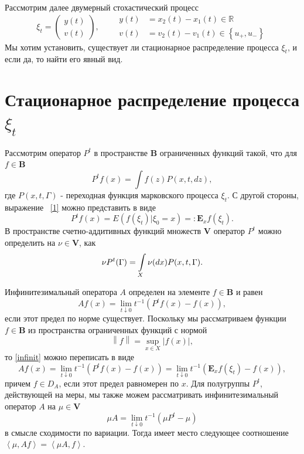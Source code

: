 \documentclass[12pt,a4paper]{article}
\begin{document}
Рассмотрим далее двумерный стохастический процесс 
\begin{equation*}
\xi_t = \begin{pmatrix}
 y(t) \\
 v(t)
\end{pmatrix}, \qquad 
\begin{aligned}
y(t) &= x_2(t) - x_1(t) \in \mathbb{R} \\
v(t) &= v_2(t) - v_1(t) \in \left\{ u_+, u_- \right\} 
\end{aligned}
\end{equation*}
Мы хотим установить, существует ли стационарное распределение процесса $\xi_t$, и если да, то найти его явный вид.

\section{Стационарное распределение процесса $\xi_t$}\label{section_2}

Рассмотрим оператор $P^t$ в пространстве $\textbf{B}$ ограниченных функций такой, что для $f \in \textbf{B}$
\begin{equation}\label{1}
P^t f(x) = \int f(z) P(x, t, dz),
\end{equation}
где $P (x, t, \Gamma)$ - переходная функция марковского процесса $\xi_t$. С другой стороны, выражение ~\eqref{1} можно представить в виде 
$$P^t f (x) = E \left( f (\xi_t) | \xi_0 = x \right) =: \mathbf{E}_x f (\xi_t).$$
В пространстве счетно-аддитивных функций множеств $\textbf{V}$ оператор $P^t$ можно определить на $\nu \in \textbf{V}$, как
\begin{equation*}
\nu P^t (\Gamma) = \int\displaylimits_X \nu (dx) P(x, t, \Gamma).
\end{equation*}

Инфинитезимальный оператора $A$ определен на элементе $f \in \textbf{B}$ и равен
\begin{equation}\label{infinit}
    A f(x) = \lim_{t \downarrow 0} t^{-1} \left( P^t f(x) - f(x) \right),
\end{equation}
если этот предел по норме существует. Поскольку мы рассматриваем функции $f \in \textbf{B}$ из пространства ограниченных функций с нормой
\begin{equation}\label{norma}
    \left\| f \right\| = \underset{x \in X}{\sup} |f(x)|,
\end{equation}
то \ref{infinit} можно переписать в виде
$$A f(x) = \lim_{t \downarrow 0} t^{-1} \left( P^t f(x) - f(x) \right) = \lim_{t \downarrow 0} t^{-1} \left( \mathbf{E}_x f (\xi_t) - f(x) \right),$$
причем $f \in D_A$, если этот предел равномерен по $x$. Для полугруппы $P^t$, действующей на меры, мы также можем рассматривать инфинитезимальный оператор $A$ на $\mu \in \textbf{V}$
$$\mu A = \lim_{t \downarrow 0} t^{-1} \left( \mu P^t - \mu \right)$$
в смысле сходимости по вариации.
Тогда имеет место следующее соотношение $\left\langle \mu, A f \right\rangle = \left\langle \mu A, f\right\rangle$. 
\end{document}
